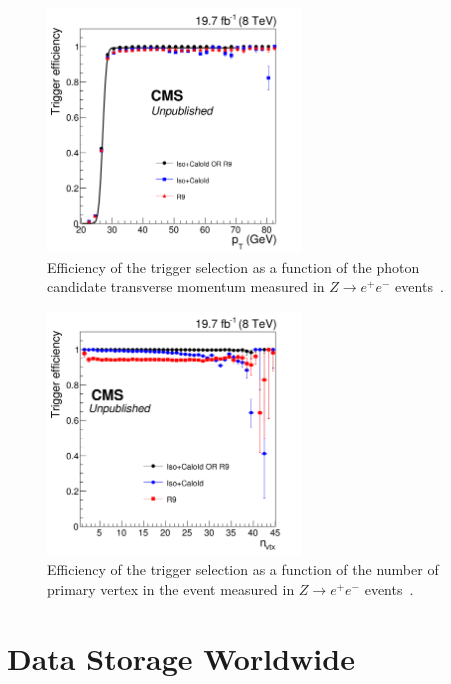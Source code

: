 \begin{figure}[htbp!]
 \begin{center}
    \includegraphics[width=0.60\textwidth]{figures/data/turnon_pt.pdf}
      \end{center}
\caption{Efficiency of the trigger selection as a function of the photon candidate transverse
momentum measured in $Z\rightarrow e^+ e^-$ events~\cite{HggCMSpaper}.}
\label{fig:ZeeTriggerPt}
\end{figure}

\begin{figure}[htbp!]
 \begin{center}
    \includegraphics[width=0.60\textwidth]{figures/data/turnon_nvtx.pdf}
      \end{center}
\caption{Efficiency of the trigger selection as a function of the number of primary vertex in the event
measured in $Z\rightarrow e^+ e^-$ events~\cite{HggCMSpaper}.}
\label{fig:ZeeTriggerNvtx}
\end{figure}


\section{Data Storage Worldwide\label{sec:storage}}

